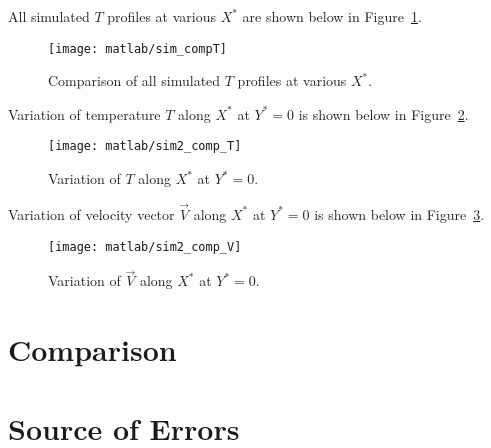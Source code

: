 All simulated $T$ profiles at various $X^*$ are shown below in Figure~\ref{fig:sim_compT}.
\begin{figure}[H]
	\centering
	\texttt{[image: matlab/sim\_compT]}
	\caption{Comparison of all simulated $T$ profiles at various $X^*$.}
	\label{fig:sim_compT}
\end{figure}


Variation of temperature $T$ along $X^*$ at $Y^*=0$ is shown below in Figure~\ref{fig:sim2_comp_T}.
\begin{figure}[H]
	\centering
	\texttt{[image: matlab/sim2\_comp\_T]}
	\caption{Variation of $T$ along $X^*$ at $Y^*=0$.}
	\label{fig:sim2_comp_T}
\end{figure}

Variation of velocity vector $\vec{V}$ along $X^*$ at $Y^*=0$ is shown below in Figure~\ref{fig:sim2_comp_V}.
\begin{figure}[H]
	\centering
	\texttt{[image: matlab/sim2\_comp\_V]}
	\caption{Variation of $\vec{V}$ along $X^*$ at $Y^*=0$.}
	\label{fig:sim2_comp_V}
\end{figure}


\section{Comparison}
\label{sec:comp}


\section{Source of Errors}
\label{sec:err}

